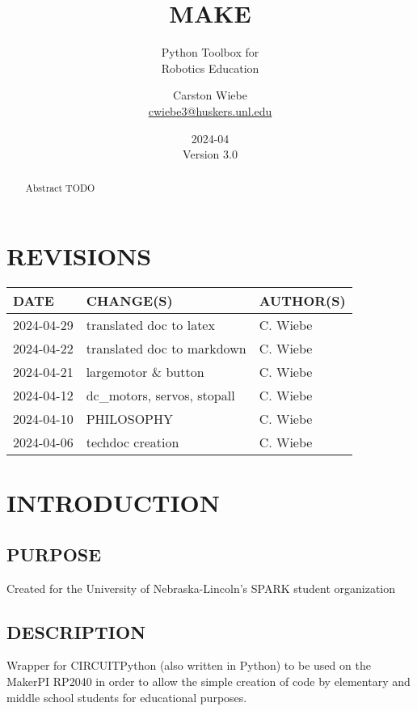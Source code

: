\documentclass[12pt]{scrartcl} %
\title{MAKE}
\subtitle{Python Toolbox for \\
          Robotics Education}
\author{Carston Wiebe \\
        \href{mailto:cwiebe3@huskers.unl.edu}{cwiebe3@huskers.unl.edu} \\
}
\date{2024-04 \\
      Version 3.0
}
\begin{document}
\maketitle
\thispagestyle{empty}

\vfill

\begin{abstract}
  Abstract TODO
\end{abstract}

\newpage
\clearpage
\section*{REVISIONS}

\begin{table}[htp]
  \centering
  \def\arraystretch{1.5}
  \begin{tabular}{|l|l|l|}
    \hline
    DATE & CHANGE(S) & AUTHOR(S) \\
    \hline
    2024-04-29 & translated doc to latex & C. Wiebe \\
    \hline
    2024-04-22 & translated doc to markdown & C. Wiebe \\
    \hline
    2024-04-21 & largemotor \& button & C. Wiebe \\
    \hline
    2024-04-12 & dc\_motors, servos, stopall & C. Wiebe \\
    \hline
    2024-04-10 & PHILOSOPHY & C. Wiebe \\
    \hline
    2024-04-06 & techdoc creation & C. Wiebe \\
    \hline
  \end{tabular}
\end{table}

\newpage
\tableofcontents

\newpage
\section{INTRODUCTION}

\subsection{PURPOSE}

Created for the University of Nebraska-Lincoln's SPARK student organization

\subsection{DESCRIPTION}

Wrapper for CIRCUITPython (also written in Python) to be used on the MakerPI
RP2040 in order to allow the simple creation of code by elementary and middle
school students for educational purposes.
\end{document}
